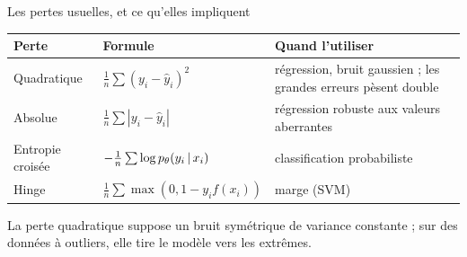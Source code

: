 \begin{frame}{Les pertes usuelles, et ce qu'elles impliquent}
\begin{center}
\footnotesize
\begin{tabular}{@{}p{}p{}p{}@{}}
\toprule
\textbf{Perte} & \textbf{Formule} & \textbf{Quand l'utiliser} \\
\midrule
Quadratique & $\frac{1}{n}\sum (y_i-\hat y_i)^2$ & régression, bruit gaussien ;
les grandes erreurs pèsent double \\
Absolue & $\frac{1}{n}\sum |y_i-\hat y_i|$ & régression robuste aux
valeurs aberrantes \\
Entropie croisée & $-\frac{1}{n}\sum \log p_\theta(y_i \,\vert\, x_i)$ &
classification probabiliste \\
Hinge & $\frac{1}{n}\sum \max(0, 1-y_i f(x_i))$ & marge (SVM) \\
\bottomrule
\end{tabular}
\end{center}
\vspace{1.5mm}
\begin{kbox}
La perte quadratique suppose un bruit symétrique de variance constante ; sur
des données à outliers, elle tire le modèle vers les extrêmes.
\end{kbox}
\end{frame}

